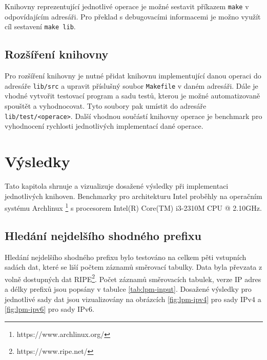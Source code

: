 Knihovny reprezentující jednotlivé operace je možné sestavit příkazem \texttt{make}
v odpovídajícím adresáři. Pro překlad s debugovacími informacemi je možno využít cíl sestavení
\texttt{make lib}.

\section{Rozšíření knihovny}\label{api:extension} %

Pro rozšíření knihovny je nutné přidat knihovnu implementující danou operaci
do adresáře \texttt{lib/src} a upravit příslušný soubor \texttt{Makefile} v daném adresáři.
Dále je vhodné vytvořit testovací program a sadu testů, kterou je možné automatizovaně spouštět a vyhodnocovat.
Tyto soubory pak umístit do adresáře \texttt{lib/test/<operace>}.
Další vhodnou součástí knihovny operace je benchmark pro vyhodnocení rychlosti jednotlivých
implementací dané operace.



\chapter{Výsledky}\label{chapter:results} %
Tato kapitola shrnuje a vizualizuje dosažené výsledky při implementaci jednotlivých knihoven.
Benchmarky pro architekturu Intel proběhly na operačním systému Archlinux \footnote{https://www.archlinux.org/} s procesorem Intel(R) Core(TM) i3-2310M CPU @ 2.10GHz.

\section{Hledání nejdelšího shodného prefixu}\label{section:results-lpm} %

Hledání nejdelšího shodného prefixu bylo testováno na celkem pěti vstupních sadách dat, které
se liší počtem záznamů směrovací tabulky. Data byla převzata z volně dostupných dat RIPE\footnote{https://www.ripe.net/}.
Počet záznamů směrovacích tabulek, verze IP adres a délky prefixů jsou popsány v tabulce \ref{tab:lpm-input}.
Dosažené výsledky pro jednotlivé sady dat jsou vizualizovány na obrázcích \ref{fig:lpm-ipv4} pro sady IPv4 a
\ref{fig:lpm-ipv6} pro sady IPv6.

